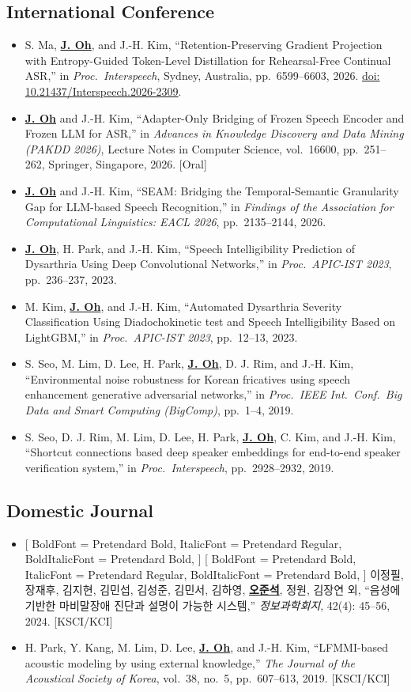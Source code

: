 \documentclass[a4paper,9pt]{extarticle}
\newenvironment{kotext}{%
  \begingroup
  \setmainfont{Pretendard}[
    BoldFont = {Pretendard Bold},
    ItalicFont = {Pretendard Regular},
    BoldItalicFont = {Pretendard Bold},
  ]
  \setmainhangulfont{Pretendard}[
    BoldFont = {Pretendard Bold},
    ItalicFont = {Pretendard Regular},
    BoldItalicFont = {Pretendard Bold},
  ]
}{%
  \endgroup
}
\newcommand{\koline}[1]{\begin{kotext}#1\end{kotext}}
\newenvironment{blockitems}{%
  \begin{itemize}[leftmargin=1.4em, itemsep=5pt, topsep=4pt, parsep=0pt, partopsep=0pt]
}{%
  \end{itemize}
}
\newcommand{\me}[1]{\textbf{\underline{#1}}}
\begin{document}
\subsection*{International Conference}
\begin{blockitems}
  \item S. Ma, \me{J. Oh}, and J.-H. Kim, ``Retention-Preserving Gradient Projection with Entropy-Guided Token-Level Distillation for Rehearsal-Free Continual ASR,'' in \textit{Proc.\ Interspeech}, Sydney, Australia, pp.~6599--6603, 2026. \href{https://doi.org/10.21437/Interspeech.2026-2309}{doi: 10.21437/Interspeech.2026-2309}.
  \item \me{J. Oh} and J.-H. Kim, ``Adapter-Only Bridging of Frozen Speech Encoder and Frozen LLM for ASR,'' in \textit{Advances in Knowledge Discovery and Data Mining (PAKDD 2026)}, Lecture Notes in Computer Science, vol.~16600, pp.~251--262, Springer, Singapore, 2026. [Oral]
  \item \me{J. Oh} and J.-H. Kim, ``SEAM: Bridging the Temporal-Semantic Granularity Gap for LLM-based Speech Recognition,'' in \textit{Findings of the Association for Computational Linguistics: EACL 2026}, pp.~2135--2144, 2026.
  \item \me{J. Oh}, H. Park, and J.-H. Kim, ``Speech Intelligibility Prediction of Dysarthria Using Deep Convolutional Networks,'' in \textit{Proc.\ APIC-IST 2023}, pp.~236--237, 2023.
  \item M. Kim, \me{J. Oh}, and J.-H. Kim, ``Automated Dysarthria Severity Classification Using Diadochokinetic test and Speech Intelligibility Based on LightGBM,'' in \textit{Proc.\ APIC-IST 2023}, pp.~12--13, 2023.
  \item S. Seo, M. Lim, D. Lee, H. Park, \me{J. Oh}, D. J. Rim, and J.-H. Kim, ``Environmental noise robustness for Korean fricatives using speech enhancement generative adversarial networks,'' in \textit{Proc.\ IEEE Int.\ Conf.\ Big Data and Smart Computing (BigComp)}, pp.~1--4, 2019.
  \item S. Seo, D. J. Rim, M. Lim, D. Lee, H. Park, \me{J. Oh}, C. Kim, and J.-H. Kim, ``Shortcut connections based deep speaker embeddings for end-to-end speaker verification system,'' in \textit{Proc.\ Interspeech}, pp.~2928--2932, 2019.
\end{blockitems}

\subsection*{Domestic Journal}
\begin{blockitems}
  \item \koline{이정필, 장재후, 김지현, 김민섭, 김성준, 김민서, 김하영, \me{오준석}, 정원, 김장연 외, ``음성에 기반한 마비말장애 진단과 설명이 가능한 시스템,'' \textit{정보과학회지}, 42(4): 45--56, 2024. [KSCI/KCI]}
  \item H. Park, Y. Kang, M. Lim, D. Lee, \me{J. Oh}, and J.-H. Kim, ``LFMMI-based acoustic modeling by using external knowledge,'' \textit{The Journal of the Acoustical Society of Korea}, vol.~38, no.~5, pp.~607--613, 2019. [KSCI/KCI]
\end{blockitems}
\end{document}
